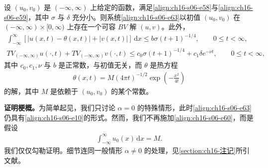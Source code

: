 \documentclass[../../main.tex]{subfiles}
\begin{document}
\begin{theorem}\label{theorem:ch16-1665}
设 $(u_0,v_0)$ 是 $(-\infty,\infty)$ 上给定的函数，满足\eqref{align:ch16-s06-e58}与\eqref{align:ch16-s06-e59}，其中 $\sigma$ 与 $\delta$ 充分小。则系统\eqref{align:ch16-s06-e63}以初值 $(u_0,v_0)$ 在 $(-\infty,\infty)\times[0,\infty)$ 上存在一个可容 $BV$ 解 $(u,v)$。此外，
\begin{align}
\int_{-\infty}^{\infty}[|u(x,t)-\theta(x,t)|+|v(x,t)|]\,\mathrm{d}x\leqslant b\sigma(t+1)^{-1/4},\qquad 0\leqslant t<\infty,
\label{align:ch16-s06-e64}\\
TV_{(-\infty,\infty)}u(\cdot,t)+TV_{(-\infty,\infty)}v(\cdot,t)\leqslant c_0\sigma(t+1)^{-1/4}+c_1\delta e^{-\nu t},\qquad 0\leqslant t<\infty,
\label{align:ch16-s06-e65}
\end{align}
其中 $c_0,c_1,\nu$ 与 $b$ 是正常数，与初值无关，而 $\theta$ 是热方程
\begin{align}
\theta(x,t)=M(4\pi t)^{-1/2}\exp\left(-\frac{x^2}{4t}\right)
\label{align:ch16-s06-e66}
\end{align}
的解，其中 $M$ 是依赖于 $(u_0,v_0)$ 的某个常数。
\end{theorem}

\textbf{证明梗概。}为简单起见，我们只讨论 $\alpha=0$ 的特殊情形，此时\eqref{align:ch16-s06-e63}仍具有\eqref{align:ch16-s06-e10}的形式。然而，我们不再施加\eqref{align:ch16-s06-e60}，而是假设
\begin{align}
\int_{-\infty}^{\infty}u_0(x)\,\mathrm{d}x=M.
\label{align:ch16-s06-e67}
\end{align}
我们仅仅勾勒证明。细节连同一般情形 $\alpha\neq0$ 的处理，见\cref{section:ch16-注记}所引文献。
\end{document}
